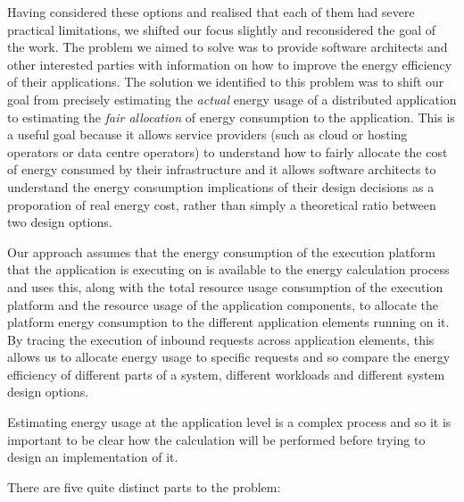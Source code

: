 Having considered these options and realised that each of them had severe practical limitations, we shifted our focus slightly and reconsidered the goal of the work.  The problem we aimed to solve was to provide software architects and other interested parties with information on how to improve the energy efficiency of their applications.  The solution we identified to this problem was to shift our  goal from precisely estimating the \emph{actual} energy usage of a distributed application to estimating the \emph{fair allocation} of energy consumption to the application.  This is a useful goal because it allows service providers (such as cloud or hosting operators or data centre operators) to understand how to fairly allocate the cost of energy consumed by their infrastructure and it allows software architects to understand the energy consumption implications of their design decisions as a proporation of real energy cost, rather than simply a theoretical ratio between two design options.

Our approach assumes that the energy consumption of the execution platform that the application is executing on is available to the energy calculation process and uses this, along with the total resource usage consumption of the execution platform and the resource usage of the application components, to allocate the platform energy consumption to the different application elements running on it.  By tracing the execution of inbound requests across application elements, this allows us to allocate energy usage to specific requests and so compare the energy efficiency of different parts of a system, different workloads and different system design options.

Estimating energy usage at the application level is a complex process and so it is important to be clear how the calculation will be performed before trying to design an implementation of it.

There are five quite distinct parts to the problem:

